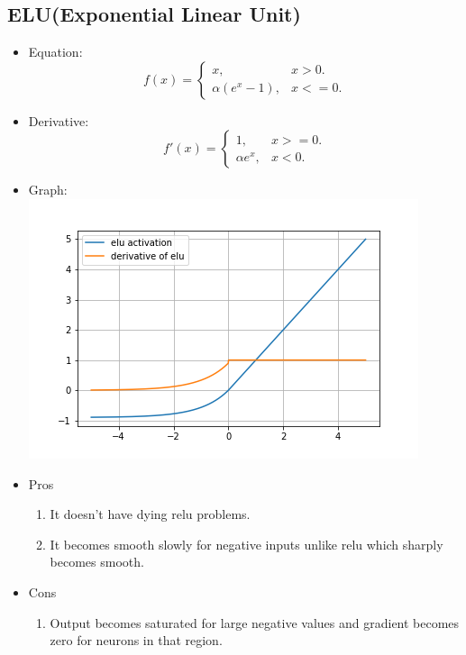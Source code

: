\documentclass{article}
\begin{document}
\subsection{ELU(Exponential Linear Unit)}
\begin{itemize}
    \item Equation: 
    \begin{equation*}
        f(x)=\begin{cases}
        x, & \text{$x>0$}.\\
        \alpha (e^x-1), & \text{$x<=0$}.
        \end{cases}
    \end{equation*}
    \item Derivative:
    \begin{equation*}
        f'(x)=\begin{cases}
        1, & \text{$x>=0$}.\\
        \alpha e^x, & \text{$x<0$}.
        \end{cases}
    \end{equation*}
    \item Graph:\\ \includegraphics[center]{elu.png}
    \item Pros
    \begin{enumerate}
        \item It doesn't have dying relu problems.
        \item It becomes smooth slowly for negative inputs unlike relu which sharply becomes smooth.
    \end{enumerate}
    \item Cons
    \begin{enumerate}
        \item Output becomes saturated for large negative values and gradient becomes zero for neurons in that region.
    \end{enumerate}
\end{itemize}
\end{document}
